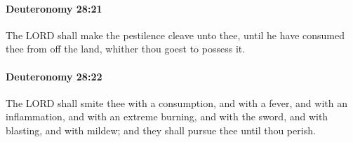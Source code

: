 		\paragraph{Deuteronomy 28:21} %
			\label{DEUTERONOMY-28-21}

			The LORD shall make the pestilence cleave unto thee, until he have consumed thee from off the land, whither thou goest to possess it.


		\paragraph{Deuteronomy 28:22} %
			\label{DEUTERONOMY-28-22}

			The LORD shall smite thee with a consumption, and with a fever, and with an inflammation, and with an extreme burning, and with the sword, and with blasting, and with mildew; and they shall pursue thee until thou perish.

